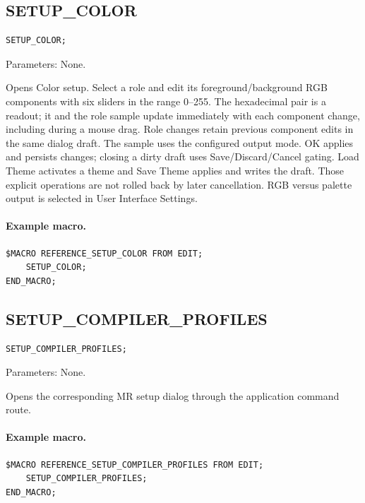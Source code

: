 \documentclass[a4paper,10pt,twoside,openany]{book}
\newenvironment{mrmacextension}{\begin{changebar}}{\end{changebar}}
\begin{document}
\begin{mrmacextension}
\label{prim:procedure-setup-color}
\subsection*{SETUP\_COLOR}
\begin{verbatim}
SETUP_COLOR;
\end{verbatim}
Parameters: None.

Opens Color setup. Select a role and edit its foreground/background RGB
components with six sliders in the range 0--255. The hexadecimal pair is a
readout; it and the role sample update immediately with each component
change, including during a mouse drag. Role changes retain previous component
edits in the same dialog draft. The sample uses the configured output mode.
OK applies and persists changes; closing a dirty draft uses Save/Discard/Cancel
gating. Load Theme activates a theme and Save Theme applies and writes the
draft. Those explicit operations are not rolled back by later cancellation.
RGB versus palette output is selected in User Interface Settings.

\paragraph{Example macro.}
\begin{verbatim}
$MACRO REFERENCE_SETUP_COLOR FROM EDIT;
    SETUP_COLOR;
END_MACRO;
\end{verbatim}
\end{mrmacextension}

\begin{mrmacextension}
\label{prim:procedure-setup-compiler-profiles}
\subsection*{SETUP\_COMPILER\_PROFILES}
\begin{verbatim}
SETUP_COMPILER_PROFILES;
\end{verbatim}
Parameters: None.

Opens the corresponding MR setup dialog through the application command route.

\paragraph{Example macro.}
\begin{verbatim}
$MACRO REFERENCE_SETUP_COMPILER_PROFILES FROM EDIT;
    SETUP_COMPILER_PROFILES;
END_MACRO;
\end{verbatim}
\end{mrmacextension}
\end{document}
